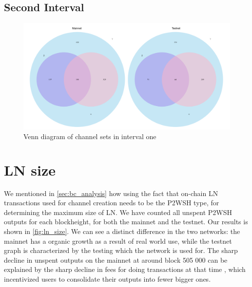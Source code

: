 \subsection{Second Interval}


\begin{figure}[h]
    \centering
    \includegraphics[width=16cm]{figures/graphs/venn_full1.png}
    \caption{Venn diagram of channel sets in interval one}
    \label{fig:venn_run2}
\end{figure}

\section{LN size}

We mentioned in \cref{sec:bc_analysis} how using the fact that on-chain LN transactions used for channel creation needs to be the P2WSH type, for determining the maximum size of LN. We have counted all unspent P2WSH outputs for each blockheight, for both the mainnet and the testnet. Our results is shown in \cref{fig:ln_size}. We can see a distinct difference in the two networks: the mainnet has a organic growth as a result of real world use, while the testnet graph is characterized by the testing which the network is used for. The sharp decline in unspent outputs on the mainnet at around block 505 000 can be explained by the sharp decline in fees for doing transactions at that time \cite{mempool_stats}, which incentivized users to consolidate their outputs into fewer bigger ones. 

